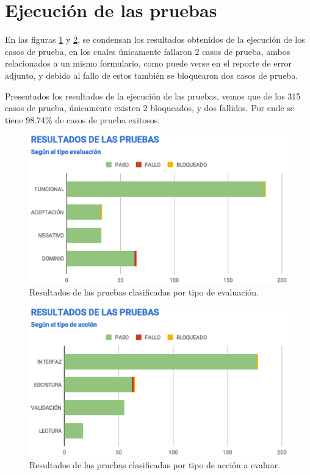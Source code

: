 \section{Ejecución de las pruebas}
En las figuras \ref{results-tests} y \ref{results-type}, se condensan los
resultados obtenidos de la ejecución de los casos de prueba, en los cuales
únicamente fallaron 2 casos de prueba, ambos relacionados a un mismo formulario,
como puede verse en el reporte de error adjunto, y debido al fallo de estos
también se bloquearon dos casos de prueba.

Presentados los resultados de la ejecución de las pruebas, vemos que de los 315
casos de prueba, únicamente existen 2 bloqueados, y dos fallidos. Por ende se
tiene 98.74\% de casos de prueba exitosos.

\begin{figure}[H]
\centering
\includegraphics[width=1.0\textwidth]{graphics/results-tests.eps}
\caption{Resultados de las pruebas clasificadas por tipo de evaluación.}
\label{results-tests}
\end{figure}

\begin{figure}[H]
\centering
\includegraphics[width=1.0\textwidth]{graphics/results-type.eps}
\caption{Resultados de las pruebas clasificadas por tipo de acción a evaluar.}
\label{results-type}
\end{figure}

